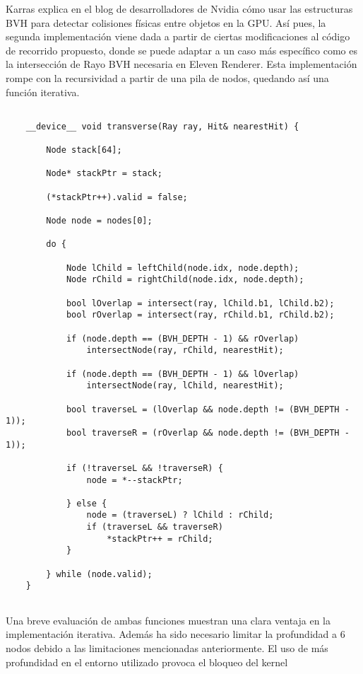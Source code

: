 	
Karras explica en el blog de desarrolladores de Nvidia cómo usar las estructuras BVH para detectar colisiones físicas entre objetos en la GPU. Así pues, la segunda implementación viene dada a partir de ciertas modificaciones al código de recorrido propuesto, donde se puede adaptar a un caso más específico como es la intersección de Rayo \- BVH necesaria en Eleven Renderer. Esta implementación rompe con la recursividad a partir de una pila de nodos, quedando así una función iterativa.

\begin{lstlisting}
		
	__device__ void transverse(Ray ray, Hit& nearestHit) {

		Node stack[64];

		Node* stackPtr = stack;

		(*stackPtr++).valid = false;

		Node node = nodes[0];

		do {

			Node lChild = leftChild(node.idx, node.depth);
			Node rChild = rightChild(node.idx, node.depth);

			bool lOverlap = intersect(ray, lChild.b1, lChild.b2);
			bool rOverlap = intersect(ray, rChild.b1, rChild.b2);

			if (node.depth == (BVH_DEPTH - 1) && rOverlap)
				intersectNode(ray, rChild, nearestHit);

			if (node.depth == (BVH_DEPTH - 1) && lOverlap)
				intersectNode(ray, lChild, nearestHit);
			
			bool traverseL = (lOverlap && node.depth != (BVH_DEPTH - 1));
			bool traverseR = (rOverlap && node.depth != (BVH_DEPTH - 1));

			if (!traverseL && !traverseR) {
				node = *--stackPtr;

			} else {
				node = (traverseL) ? lChild : rChild;
				if (traverseL && traverseR)
					*stackPtr++ = rChild;
			}

		} while (node.valid);
	}
	
\end{lstlisting}

Una breve evaluación de ambas funciones muestran una clara ventaja en la implementación iterativa. Además ha sido necesario limitar la profundidad a 6 nodos debido a las limitaciones mencionadas anteriormente. El uso de más profundidad en el entorno utilizado provoca el bloqueo del kernel



